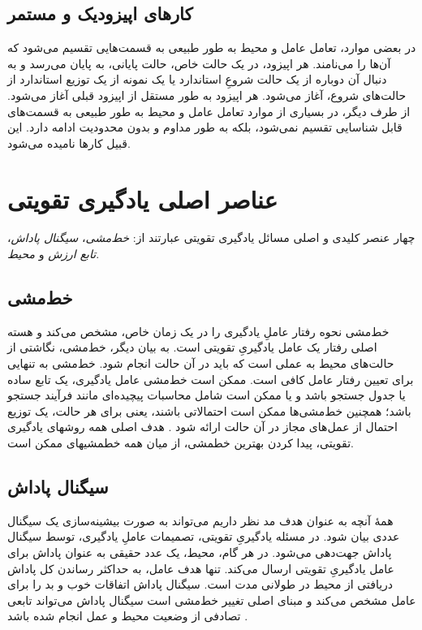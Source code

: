 \subsection{کارهای اپیزودیک و مستمر}
در بعضی موارد، تعامل عامل و محیط به طور طبیعی به قسمت‌هایی تقسیم می‌شود که آن‌ها را 
\textit{}
می‌نامند. هر اپیزود، در یک حالت خاص، حالت پایانی، به پایان می‌رسد و به دنبال آن دوباره از یک حالت شروعِ استاندارد یا یک نمونه از یک توزیع استاندارد از حالت‌های شروع، آغاز می‌شود. هر اپیزود به طور مستقل از اپیزود قبلی آغاز می‌شود.
از طرف دیگر، در بسیاری از موارد تعامل عامل و محیط به طور طبیعی به قسمت‌های قابل شناسایی تقسیم نمی‌شود، بلکه به طور مداوم و بدون محدودیت ادامه دارد. این قبیل کارها 
\textit{
}
 نامیده می‌شود.
\section{عناصر اصلی یادگیری تقویتی}
چهار عنصر کلیدی و اصلی مسائل یادگیری تقویتی عبارتند از:
\textit{خط‌مشی}، 
\textit{سیگنال پاداش}،
\textit{تابع ارزش} 
و
\textit{محیط}.
\subsection{خط‌مشی}
خط‌مشی 
نحوه رفتار عاملِ یادگیری را در یک زمان خاص، مشخص می‌کند و هسته اصلی رفتار یک عامل یادگیریِ تقویتی است. به بیان دیگر، خط‌مشی، نگاشتی از حالت‌های محیط به عملی است که باید در آن حالت انجام شود. خط‌مشی به تنهایی برای تعیین رفتار عامل کافی است. ممکن است
خط‌مشی عامل یادگیری، یک تابع ساده یا جدول جستجو باشد و یا ممکن است شامل محاسبات پیچیده‌ای مانند فرآیند جستجو باشد؛ همچنین
خط‌مشی‌ها ممکن است احتمالاتی باشند، یعنی برای هر حالت، یک توزیع احتمال از عمل‌های مجاز در آن حالت ارائه شود
\cite{suttonbook}.
هدف اصلی همه روش\nf های یادگیری تقویتی، پیدا کردن بهترین خط\nf مشی، از میان 
همه خط\nf مشی\nf های ممکن است.
\subsection{سیگنال پاداش}
همهٔ آنچه به عنوان هدف مد نظر داریم می‌تواند به صورت بیشینه‌سازی  یک سیگنال عددی بیان شود. در مسئله یادگیریِ تقویتی، تصمیمات عاملِ یادگیری، توسط سیگنال پاداش جهت‌دهی می‌شود. در هر گام، محیط، یک عدد حقیقی به عنوان پاداش برای عامل یادگیریِ تقویتی ارسال می‌کند. تنها هدف عامل، به حداکثر رساندن کل پاداش دریافتی از محیط در طولانی مدت است. سیگنال پاداش اتفاقات خوب و بد را برای عامل مشخص می‌کند و مبنای اصلی تغییر خط‌مشی است
سیگنال پاداش می‌تواند تابعی تصادفی از وضعیت محیط و عمل انجام شده باشد
\cite{suttonbook}.
